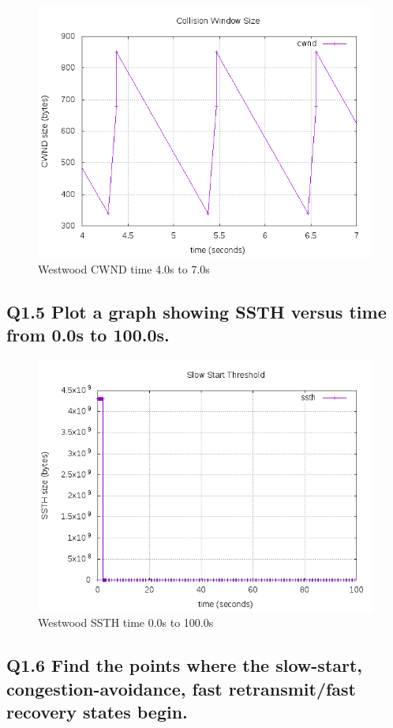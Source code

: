 \documentclass{article}
\begin{document}
\begin{figure}[H]
\centering
\includegraphics[width=12cm]{figures/cwndWestwood_3.png}
\caption{Westwood CWND time 4.0s to 7.0s}
\end{figure}




\subsection{Q1.5 Plot a graph showing SSTH versus time from 0.0s to
100.0s.}


\begin{figure}[H]
\centering
\includegraphics[width=12cm]{figures/ssthWestwood.png}
\caption{Westwood SSTH time 0.0s to 100.0s}
\end{figure}

\subsection{Q1.6 Find the points where the slow-start,
congestion-avoidance, fast retransmit/fast recovery states begin.}
\end{document}
